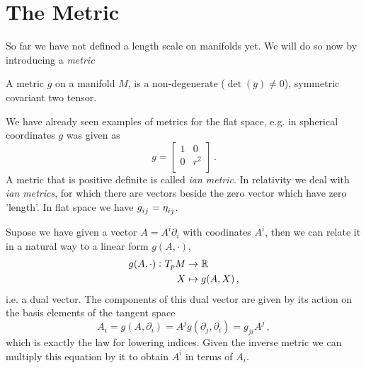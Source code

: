 \section{The Metric}
So far we have not defined a length scale on manifolds yet. We will do so now by
introducing a \emph{metric} 
\begin{definition}[Metric]
A metric $g$ on a manifold $M$, is a non-degenerate ($\det(g)\neq 0$), symmetric
covariant two tensor.
\end{definition}
We have already seen examples of metrics for the flat space, e.g. in spherical coordinates $g$ was given as
\begin{equation}
    g=
    \begin{bmatrix}
        1 & 0\\
        0 & r^2\\
    \end{bmatrix}\,.
\end{equation}
A metric that is positive definite is called \emph{ian metric}. In
relativity we deal with \emph{ian metrics}, for which there are
vectors beside the zero vector which have zero 'length'. In flat space we have
$\tensor{g}{_i_j}=\tensor{\eta}{_i_j}$.
\begin{remark} Supose we have given a vector $A=A^i\partial_i$
with coodinates $A^i$, then we can relate it 
in a natural way to a linear form $g(A,\cdot)$,
\begin{equation}
\begin{split}
 g(A,\cdot)\,\colon T_pM &\to \mathbb{R}\\
 X &\mapsto g(A,X)\, ,
\end{split}
\end{equation}
i.e. a dual vector. The components of this dual vector are given by its action
on the basis elements of the tangent space
\begin{equation}
A_i=g(A,\partial_i)=A^jg(\partial_j,\partial_i)=g_{ji}A^j\,,
\end{equation}
which is exactly the law for lowering indices. Given the inverse metric we can
multiply this equation by it to obtain $A^i$ in terms of $A_i$.
\end{remark}
